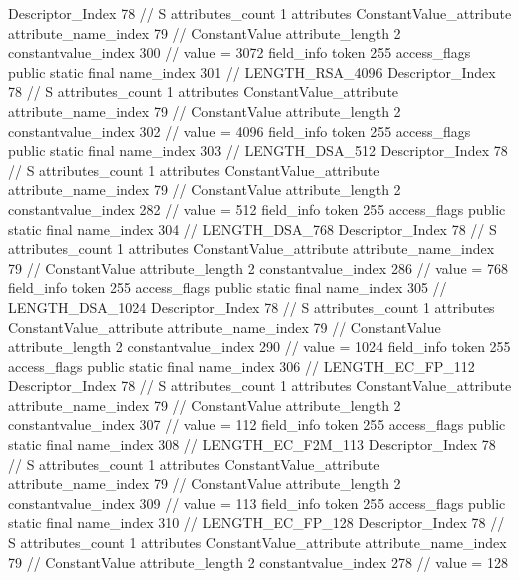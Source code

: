 {{{{{				Descriptor_Index	78		// S
				attributes_count	1
				attributes {
				ConstantValue_attribute {
					attribute_name_index	79		// ConstantValue
					attribute_length	2
					constantvalue_index	300		// value = 3072
				}
				}
			}
			field_info {
				token	255
				access_flags	public static final
				name_index	301		// LENGTH_RSA_4096
				Descriptor_Index	78		// S
				attributes_count	1
				attributes {
				ConstantValue_attribute {
					attribute_name_index	79		// ConstantValue
					attribute_length	2
					constantvalue_index	302		// value = 4096
				}
				}
			}
			field_info {
				token	255
				access_flags	public static final
				name_index	303		// LENGTH_DSA_512
				Descriptor_Index	78		// S
				attributes_count	1
				attributes {
				ConstantValue_attribute {
					attribute_name_index	79		// ConstantValue
					attribute_length	2
					constantvalue_index	282		// value = 512
				}
				}
			}
			field_info {
				token	255
				access_flags	public static final
				name_index	304		// LENGTH_DSA_768
				Descriptor_Index	78		// S
				attributes_count	1
				attributes {
				ConstantValue_attribute {
					attribute_name_index	79		// ConstantValue
					attribute_length	2
					constantvalue_index	286		// value = 768
				}
				}
			}
			field_info {
				token	255
				access_flags	public static final
				name_index	305		// LENGTH_DSA_1024
				Descriptor_Index	78		// S
				attributes_count	1
				attributes {
				ConstantValue_attribute {
					attribute_name_index	79		// ConstantValue
					attribute_length	2
					constantvalue_index	290		// value = 1024
				}
				}
			}
			field_info {
				token	255
				access_flags	public static final
				name_index	306		// LENGTH_EC_FP_112
				Descriptor_Index	78		// S
				attributes_count	1
				attributes {
				ConstantValue_attribute {
					attribute_name_index	79		// ConstantValue
					attribute_length	2
					constantvalue_index	307		// value = 112
				}
				}
			}
			field_info {
				token	255
				access_flags	public static final
				name_index	308		// LENGTH_EC_F2M_113
				Descriptor_Index	78		// S
				attributes_count	1
				attributes {
				ConstantValue_attribute {
					attribute_name_index	79		// ConstantValue
					attribute_length	2
					constantvalue_index	309		// value = 113
				}
				}
			}
			field_info {
				token	255
				access_flags	public static final
				name_index	310		// LENGTH_EC_FP_128
				Descriptor_Index	78		// S
				attributes_count	1
				attributes {
				ConstantValue_attribute {
					attribute_name_index	79		// ConstantValue
					attribute_length	2
					constantvalue_index	278		// value = 128
				}
}}}}}}
